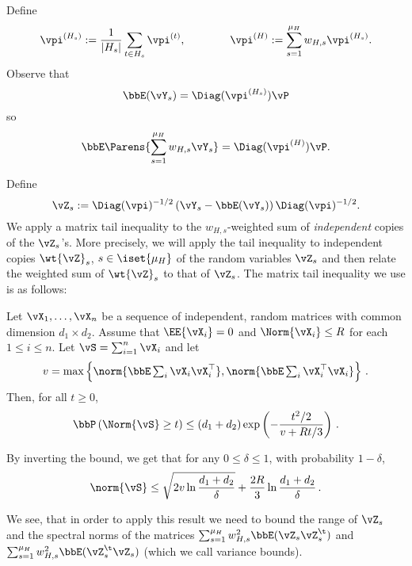 Define%
\begin{align*}
  \vpi^{(H_s)}  := \frac1{|H_s|} \sum_{t \in H_s} \vpi^{(t)} , \qquad \qquad
  \vpi^{(H)}  := \sum_{s=1}^{\mu_H} w_{H,s} \vpi^{(H_s)} .
\end{align*}
Observe that
\[
  \bbE(\vY_s)
  = \Diag(\vpi^{(H_s)}) \vP
\]
so
\[
  \bbE\Parens{
    \sum_{s=1}^{\mu_H} w_{H,s} \vY_s
  } = \Diag(\vpi^{(H)}) \vP
  .
\]

Define
\[
  \vZ_s
  := \Diag(\vpi)^{-1/2} \left( \vY_s 
  - \bbE(\vY_s) \right)\Diag(\vpi)^{-1/2}
  .
\]
We apply a matrix tail inequality to the
$w_{H,s}$-weighted sum of \emph{independent} copies of the $\vZ_s$'s.
More precisely, we will apply the tail inequality to independent copies $\wt{\vZ}_s$, $s\in \iset{\mu_H}$ 
of the random variables $\vZ_s$ and then relate the weighted sum of $\wt{\vZ}_s$ to that of $\vZ_s$.
The matrix tail inequality we use is as follows:
\begin{theorem}
\label{thm:mxbernstein}
Let $\vX_1,\dots,\vX_n$ be a sequence of independent, random matrices with common dimension $d_1\times d_2$.
Assume that $\EE{\vX_i} = 0$ and $\Norm{\vX_i}\le R$ for each $1\le i \le n$. Let $\vS = \sum_{i=1}^n \vX_i$ and let 
\begin{align*}
v = \max\left\{ \norm{\bbE \textstyle\sum_i \vX_i \vX_i^\top  }, 
						      \norm{\bbE \textstyle\sum_i \vX_i^\top \vX_i  }
			\right\}\,.
\end{align*}
Then, for all $t\ge 0$, 
\[
\bbP\left( \Norm{\vS} \ge t \right) \le (d_1 + d_2) \exp\left( -\frac{t^2/2}{v+R t/3}\right)\,.
\]
\end{theorem}
By inverting the bound, we get that for any $0\le \delta \le 1$, with probability $1-\delta$, 
\[
\norm{\vS} \le \sqrt{2 v \ln \frac{d_1+d_2}{\delta}} + \frac{2R}{3} \ln\frac{d_1+d_2}{\delta}\,.
\]

We see, that in order to apply this result we need to bound the range of $\vZ_s$ and 
the spectral norms of the matrices $\sum_{s=1}^{\mu_H}
w_{H,s}^2 \bbE(\vZ_s \vZ_s^\t)$ and $\sum_{s=1}^{\mu_H} w_{H,s}^2
\bbE(\vZ_s^\t \vZ_s)$ (which we call variance bounds).

